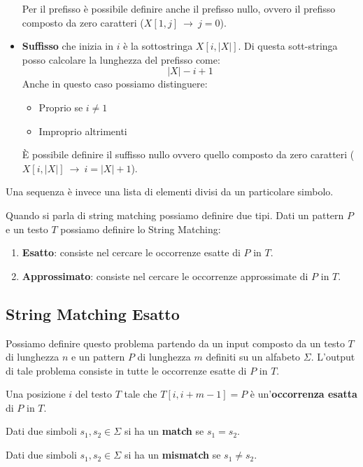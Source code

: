 \begin{definizione}
\begin{itemize}
\begin{itemize}
              \end{itemize}
              Per il prefisso è possibile definire anche il prefisso nullo, ovvero
              il prefisso composto da zero caratteri ($X[1, j] \ \to \ j = 0$).
        \item \textbf{Suffisso} che inizia in $i$ è la sottostringa $X[i,|X|]$.
              Di questa sott-stringa posso calcolare la lunghezza del prefisso come:
              \begin{equation}
                  |X| - i + 1
              \end{equation}
              Anche in questo caso possiamo distinguere:
              \begin{itemize}
                  \item Proprio se $i \neq 1$
                  \item Improprio altrimenti
              \end{itemize}
              È possibile definire il suffisso nullo ovvero quello composto da
              zero caratteri ($X[i,|X|] \ \to \ i = |X| + 1$).
    \end{itemize}
\end{definizione}
\begin{nota}
    Una sequenza è invece una lista di elementi divisi da un particolare simbolo.
\end{nota}

Quando si parla di string matching possiamo definire due tipi. Dati un pattern
$P$ e un testo $T$ possiamo definire lo String Matching:
\begin{enumerate}
    \item \textbf{Esatto}: consiste nel cercare le occorrenze esatte di $P$ in $T$.
    \item \textbf{Approssimato}: consiste nel cercare le occorrenze approssimate di $P$ in $T$.
\end{enumerate}
\subsection{String Matching Esatto}
Possiamo definire questo problema partendo da un input composto da un testo $T$ di
lunghezza $n$ e un pattern $P$ di lunghezza $m$ definiti su un alfabeto $\Sigma$.
L'output di tale problema consiste in tutte le occorrenze esatte di $P$ in $T$.
\begin{definizione}
    Una posizione $i$ del testo $T$ tale che $T[i, i + m - 1] = P$ è un'\textbf{occorrenza esatta} di $P$ in $T$.
\end{definizione}
\begin{definizione}
    Dati due simboli $s_1, s_2 \in \Sigma$ si ha un \textbf{match} se $s_1 = s_2$.
\end{definizione}
\begin{definizione}
    Dati due simboli $s_1, s_2 \in \Sigma$ si ha un \textbf{mismatch} se $s_1 \neq s_2$.
\end{definizione}

